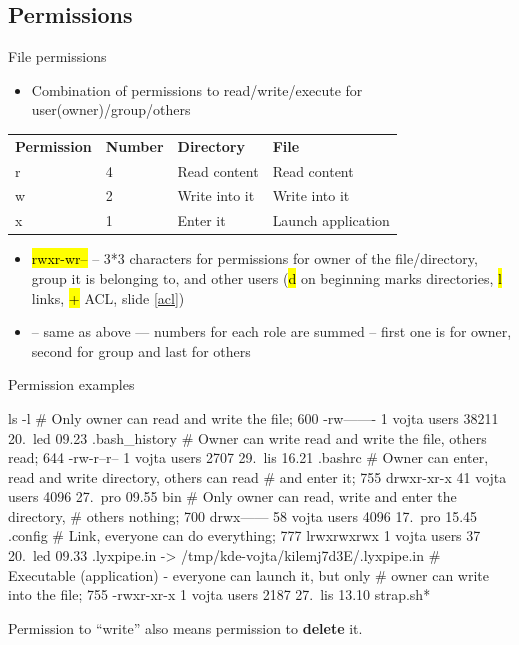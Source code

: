 \documentclass[compress, ucs, xelatex, 11pt, xcolor=svgnames,
  hyperref={
    bookmarks=true,
    unicode=true,
    colorlinks=true,
    pdftitle={Linux, command line and MetaCentrum},
    plainpages=false,
    pdfauthor={Vojtech Zeisek},
    pdfsubject={Course about use of Linux command line, writing shell scripts and using MetaCentrum of CESNET},
    pdfcreator={XeLaTeX},
    pdfkeywords={Linux, GNU, BASH, shell, command line, MetaCentrum},
    linkcolor=Red,
    anchorcolor=Blue,
    citecolor=Purple,
    filecolor=DodgerBlue,
    menucolor=DarkOrchid,
    urlcolor=DeepSkyBlue,
    pdftex},
  url={hyphens, lowtilde} %
  ]{beamer}
\renewcommand{\texttt}[1]{\hl{\ttfamily #1}}
\begin{document}
\subsection{Permissions}

\begin{frame}{File permissions}
\begin{itemize}
  \item Combination of permissions to read/write/execute for user(owner)/group/others
\end{itemize}
\begin{center}
\begin{tabular}{llll}
\textbf{Permission} & \textbf{Number} & \textbf{Directory} & \textbf{File}\\
r & 4 & Read content & Read content\\
w & 2 & Write into it & Write into it\\
x & 1 & Enter it & Launch application \\
\end{tabular}
\end{center}
\begin{itemize}
  \item \texttt{rwxr-wr--} -- 3*3 characters for permissions for owner of the file/directory, group it is belonging to, and other users (\texttt{d} on beginning marks directories, \texttt{l} links, \texttt{+} ACL, slide \ref{acl})
  \item \texttt{764} -- same as above --- numbers for each role are summed -- first one is for owner, second for group and last for others
\end{itemize}
\end{frame}

\begin{frame}[fragile]{Permission examples}
\begin{bashcode}
    ls -l
    # Only owner can read and write the file; 600
    -rw-------   1 vojta users   38211 20. led 09.23 .bash_history
    # Owner can write read and write the file, others read; 644
    -rw-r--r--   1 vojta users    2707 29. lis 16.21 .bashrc
    # Owner can enter, read and write directory, others can read
    # and enter it; 755
    drwxr-xr-x  41 vojta users    4096 27. pro 09.55 bin
    # Only owner can read, write and enter the directory,
    # others nothing; 700
    drwx------  58 vojta users    4096 17. pro 15.45 .config
    # Link, everyone can do everything; 777
    lrwxrwxrwx   1 vojta users      37 20. led 09.33 .lyxpipe.in ->
      /tmp/kde-vojta/kilemj7d3E/.lyxpipe.in
    # Executable (application) - everyone can launch it, but only
    # owner can write into the file; 755
    -rwxr-xr-x   1 vojta users    2187 27. lis 13.10 strap.sh*
\end{bashcode}
\vfil
Permission to ``write'' also means permission to \textbf{delete} it.
\end{frame}
\end{document}
